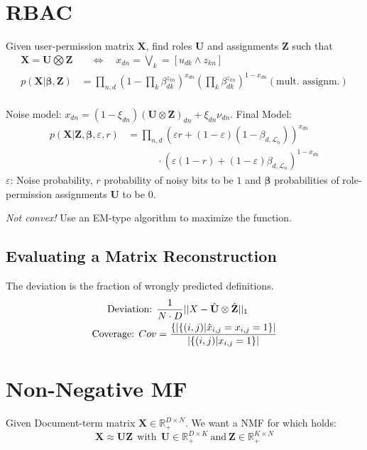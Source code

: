 \documentclass[a4paper,11pt,landscape]{article}
\renewcommand{\epsilon}{\varepsilon}
\newcommand{\R}{\mathbb{R}}
\newcommand{\sectionline}{\noindent\makebox[\linewidth]{\rule{\columnwidth}{0.1pt}}}
\newcommand{\msection}[1]{\vspace{-1mm}\sectionline\vspace{-1mm}\section{#1}\vspace{-1mm}}
\begin{document}
\begin{multicols}{3}
\msection{RBAC}
Given user-permission matrix $\mathbf X$, find roles $\mathbf U$ and assignments $\mathbf Z$ such that
\begin{align*}
    \mathbf X = \mathbf U \bigotimes \mathbf Z &\quad \Longleftrightarrow \quad x_{dn} = \bigvee_k = [u_{dk} \land z_{kn}]\\
  p(\mathbf X|\mathbf \beta, \mathbf Z) &= \prod_{n,d}\left(
   1 - \prod_k \beta_{dk}^{z_{kn}}\right)^{x_{dn}}\left( \prod_k \beta_{dk}^{z_{kn}}\right)^{1-x_{dn}} (\text{mult. assignm.})\\
\end{align*}

Noise model: $x_{dn} = (1-\xi_{dn})(\mathbf U \otimes \mathbf Z)_{dn}+\xi_{dn}\nu_{dn}$. Final Model:
\begin{align*}
   p(\mathbf X| \mathbf Z, \mathbf \beta, \epsilon, r) &=
   \prod_{n,d}\left(\epsilon r + (1-\epsilon)(1-\beta_{d, \mathcal L_n}) \right)^{x_{dn}}\\
   & \qquad\quad \cdot \left( \epsilon(1-r)+(1-\epsilon)\beta_{d,\mathcal L_n} \right)^{1-x_{dn}}
\end{align*}
$\epsilon$: Noise probability, $r$ probability of noisy bits to be $1$ and $\mathbf \beta$ probabilities of role-permission assignments $\mathbf U$ to be $0$.

\emph{Not convex!} Use an EM-type algorithm to maximize the function.
\subsection{Evaluating a Matrix Reconstruction}
The deviation is the fraction of wrongly predicted definitions.
\begin{align*}
  \text{Deviation: }& {1\over N\cdot D} ||X-\hat{ \mathbf{U}} \otimes \hat{\mathbf Z} ||_1 \\
  \text{Coverage: } Cov & = {\{|\{(i,j)|\hat x_{i,j} = x_{i,j} = 1\}| \over |\{(i,j)|x_{i,j}=1\}|}
\end{align*}

\msection{Non-Negative MF}
Given Document-term matrix $\mathbf X\in \R_+^{D\times N}$. We want a NMF for which holds:
\[
 \mathbf X \approx \mathbf{UZ} \ \ \text{with}\ \  \mathbf U\in \R_+^{D \times K}\ \text{and}\ \mathbf Z\in \R_+^{K\times N}
\]


\end{multicols}
\end{document}
